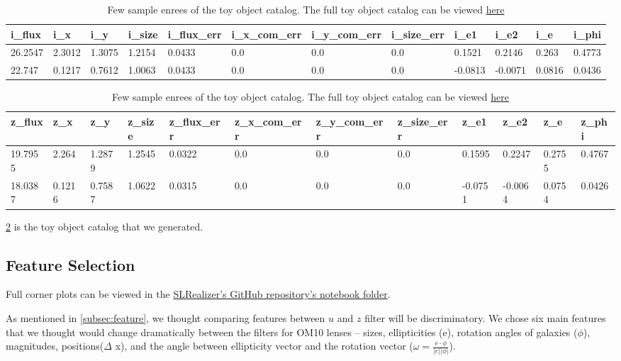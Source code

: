 \documentclass[\docopts]{\docclass}
\begin{document}
\begin{table}[!h]
\begin{tabular}{|l|l|l|l|l|l|l|l|l|l|l|l|}
\hline
i\_flux & i\_x   & i\_y   & i\_size & i\_flux\_err & i\_x\_com\_err & i\_y\_com\_err & i\_size\_err & i\_e1   & i\_e2   & i\_e   & i\_phi \\ \hline
26.2547 & 2.3012 & 1.3075 & 1.2154  & 0.0433       & 0.0            & 0.0            & 0.0          & 0.1521  & 0.2146  & 0.263  & 0.4773 \\
22.747  & 0.1217 & 0.7612 & 1.0063  & 0.0433       & 0.0            & 0.0            & 0.0          & -0.0813 & -0.0071 & 0.0816 & 0.0436 \\ \hline
\end{tabular}

\begin{tabular}{|l|l|l|l|l|l|l|l|l|l|l|l|}
\hline
z\_flux & z\_x   & z\_y   & z\_size & z\_flux\_err & z\_x\_com\_err & z\_y\_com\_err & z\_size\_err & z\_e1   & z\_e2   & z\_e   & z\_phi \\ \hline
19.7955 & 2.264  & 1.2879 & 1.2545  & 0.0322       & 0.0            & 0.0            & 0.0          & 0.1595  & 0.2247  & 0.2755 & 0.4767 \\
18.0387 & 0.1216 & 0.7587 & 1.0622  & 0.0315       & 0.0            & 0.0            & 0.0          & -0.0751 & -0.0064 & 0.0754 & 0.0426 \\ \hline
\end{tabular}

\caption{Few sample enrees of the toy object catalog. The full toy object catalog can be viewed \href{https://www.dropbox.com/s/ob51rxjexzuervl/toy_object_catalog.csv?dl=0}{here}}
\label{table:object_table}
\end{table}

\ref{table:object_table} is the toy object catalog that we generated.

\subsection{Feature Selection}
\label{subsec:feature_data}

Full corner plots can be viewed in the \href{https://github.com/jennykim1016/SLRealizer/blob/master/notebooks/SDSSvsOM10.ipynb}{SLRealizer's GitHub repository's notebook folder}.

As mentioned in \ref{subsec:feature}, we thought comparing features between $u$ and $z$ filter will be discriminatory. We chose six main features that we thought would change dramatically between the filters for OM10 lenses -- sizes, ellipticities (e), rotation angles of galaxies ($\phi$), magnitudes, positions($\Delta$ x), and the angle between ellipticity vector and the rotation vector ($\omega = \frac{e \cdot \phi}{ \left | e \right | \left | \phi \right |}$).
\end{document}
